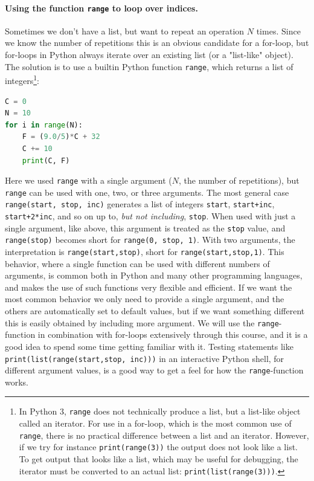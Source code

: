 \documentclass[graybox,envcountchap,sectrefs,final]{svmonodo}
\begin{document}
\paragraph{Using the function \texttt{range} to loop over indices.}
Sometimes we don't have a list, but want to repeat an
operation $N$ times. Since we know the number of repetitions this is an obvious candidate for a for-loop,
but for-loops in Python always iterate over an existing list (or a "list-like" object). The solution is to use a
builtin Python function \texttt{range}, which returns a list of integers\footnote{In Python 3, \texttt{range} does not technically produce a list, but a list-like object called an iterator. For use in a for-loop, which is the most common use of \texttt{range}, there is no practical difference between a list and an iterator. However, if we try for instance \texttt{print(range(3))} the output does not look like a list. To get output that looks like a list, which may be useful for debugging, the iterator must be converted to an actual list: \texttt{print(list(range(3)))}.}:
\begin{lstlisting}[language=Python,style=blue1bar]
C = 0
N = 10
for i in range(N):
    F = (9.0/5)*C + 32
    C += 10
    print(C, F)
\end{lstlisting}
Here we used \texttt{range} with a single argument ($N$, the number of repetitions), but \texttt{range} can be used with one, two,
or three arguments. The most general case \texttt{range(start, stop, inc)} generates a list of integers
\texttt{start}, \texttt{start+inc}, \texttt{start+2*inc}, and so on up to, \emph{but not including}, \texttt{stop}. When used with just a single argument,
like above, this argument is treated as the \texttt{stop} value, and \texttt{range(stop)} becomes short for \texttt{range(0, stop, 1)}.
With two arguments, the interpretation is \texttt{range(start,stop)}, short for \texttt{range(start,stop,1)}. This behavior, where
a single function can be used with different numbers of arguments, is common both in Python and many other programming
languages, and makes the use of such functions very flexible and efficient. If we want the most common behavior we
only need to provide a single argument, and the others are automatically set to default values, but if we want something
different this is easily obtained by including more argument. We will use the \texttt{range}-function in
combination with for-loops extensively
through this course, and it is a good idea to spend some time getting familiar with it. Testing statements
like \texttt{print(list(range(start,stop, inc)))} in an interactive Python shell, for different argument values,
is a good way to get a feel for how the \texttt{range}-function works.
\end{document}
